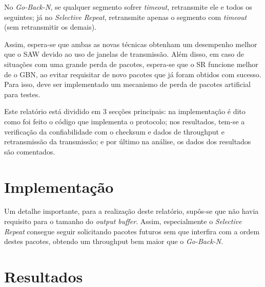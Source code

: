\documentclass[11pt,a4paper]{article}
\begin{document}
No \textit{Go-Back-N}, se qualquer segmento sofrer \textit{timeout}, retransmite ele e todos os seguintes; já no \textit{Selective Repeat},
retransmite apenas o segmento com \textit{timeout} (sem retransmitir os demais).

Assim, espera-se que ambas as novas técnicas obtenham um desempenho melhor que o SAW devido ao uso de janelas de transmissão. Além disso,
em caso de situações com uma grande perda de pacotes, espera-se que o SR funcione melhor de o GBN, ao evitar requisitar de novo pacotes que
já foram obtidos com sucesso. Para isso, deve ser implementado um mecanismo de perda de pacotes artificial para testes.

Este relatório está dividido em 3 secções principais: na implementação é dito como foi feito o código que implementa o protocolo;
nos resultados, tem-se a verificação da confiabilidade com o checksum e dados de throughput e retransmissão da transmissão;
e por último na análise, os dados dos resultados são comentados.

\section{Implementação}


Um detalhe importante, para a realização deste relatório, supôs-se que não havia requisito para o tamanho do \textit{output buffer}. 
Assim, especialmente o \textit{Selective Repeat} consegue seguir solicitando pacotes futuros sem que interfira com a ordem destes pacotes, obtendo
um throughput bem maior que o \textit{Go-Back-N}.



\section{Resultados}
\end{document}
